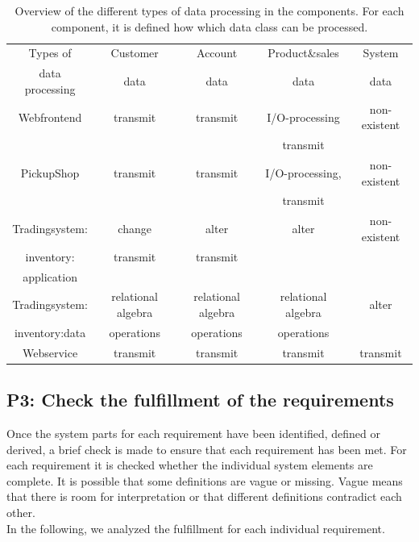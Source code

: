 
\begin{table}
\begin{tabular}{|c|c|c|c|c|}
\hline 
Types of  & Customer & Account & Product\&sales & System  \\ 
data processing  & data & data & data & data \\
\hline 
Webfrontend &  transmit & transmit & I/O-processing & non-existent \\ 
& & &  transmit & \\
\hline 
PickupShop &  transmit & transmit & I/O-processing, & non-existent \\ 
& & & transmit & \\
\hline 
Tradingsystem:& change & alter & alter & non-existent \\ 
inventory: & transmit& transmit & & \\
application & & & & \\
\hline 
Tradingsystem: & relational algebra& relational algebra& relational algebra& alter \\
inventory:data & operations & operations & operations & \\ 
\hline
Webservice & transmit & transmit & transmit & transmit \\
\hline 
\end{tabular} 
\caption{Overview of the different types of data processing in the components. For each component, it is defined how which data class can be processed.}
\label{typeMatrix}
\end{table}
\subsection{P3: Check the fulfillment of the requirements}
\label{shortcommingsCoCoME}
Once the system parts for each requirement have been identified, defined or derived, a brief check is made to ensure that each requirement has been met. For each requirement it is checked whether the individual system elements are complete. It is possible that some definitions are vague or missing. Vague means that there is room for interpretation or that different definitions contradict each other. \\ In the following, we analyzed the fulfillment for each individual requirement. 
